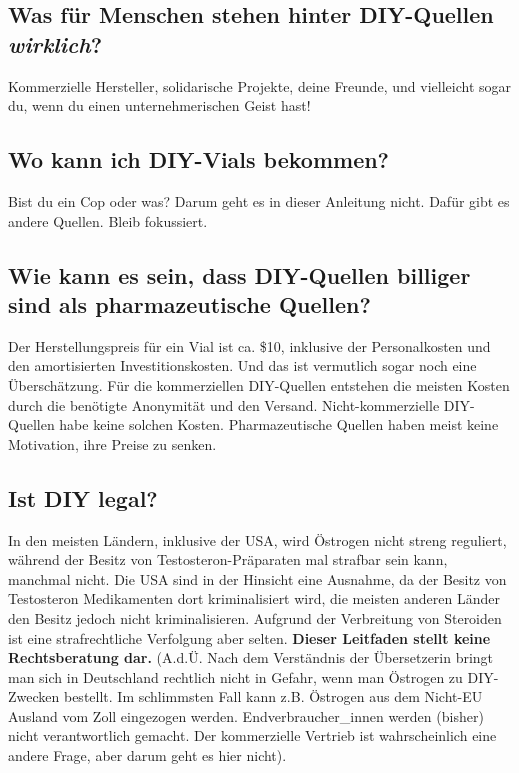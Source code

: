 \documentclass{article}
\begin{document}
\subsection{Was für Menschen stehen hinter DIY-Quellen \textit{wirklich}?}

Kommerzielle Hersteller, solidarische Projekte, deine Freunde, und vielleicht sogar du, wenn du einen unternehmerischen Geist hast!

\subsection{Wo kann ich DIY-Vials bekommen?}

Bist du ein Cop oder was? Darum geht es in dieser Anleitung nicht. Dafür gibt es andere Quellen. Bleib fokussiert.

\subsection{Wie kann es sein, dass DIY-Quellen billiger sind als pharmazeutische Quellen?}

Der Herstellungspreis für ein Vial ist ca. \$10, inklusive der Personalkosten und den amortisierten Investitionskosten. Und das ist vermutlich sogar noch eine Überschätzung. Für die kommerziellen DIY-Quellen entstehen die meisten Kosten durch die benötigte Anonymität und den Versand. Nicht-kommerzielle DIY-Quellen habe keine solchen Kosten. Pharmazeutische Quellen haben meist keine Motivation, ihre Preise zu senken. 

\subsection{Ist DIY legal?}\label{6-11}

In den meisten Ländern, inklusive der USA, wird Östrogen nicht streng reguliert, während der Besitz von Testosteron-Präparaten mal strafbar sein kann, manchmal nicht. Die USA sind in der Hinsicht eine Ausnahme, da der Besitz von Testosteron Medikamenten dort kriminalisiert wird, die meisten anderen Länder den Besitz jedoch nicht kriminalisieren. Aufgrund der Verbreitung von Steroiden ist eine strafrechtliche Verfolgung aber selten. \textbf{Dieser Leitfaden stellt keine Rechtsberatung dar.} 
(A.d.Ü. Nach dem Verständnis der Übersetzerin bringt man sich in Deutschland rechtlich nicht in Gefahr, wenn man Östrogen zu DIY-Zwecken bestellt. Im schlimmsten Fall kann z.B. Östrogen aus dem Nicht-EU Ausland vom Zoll eingezogen werden. Endverbraucher\_innen werden (bisher) nicht verantwortlich gemacht. Der kommerzielle Vertrieb ist wahrscheinlich eine andere Frage, aber darum geht es hier nicht).
\end{document}
